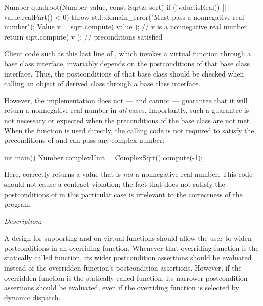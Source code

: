 \begin{codeblock}
Number quadroot(Number value, const Sqrt& sqrt) {
  if (!value.isReal() || value.realPart() < 0) {
    throw std::domain_error("Must pass a nonnegative real number");
  }
  Value v = sqrt.compute( {value} ); // v is a nonnegative real number
  return sqrt.compute( {v} ); // preconditions satisfied 
}
\end{codeblock}

Client code such as this last line of , which invokes a virtual function through a base class interface, invariably depends on the postconditions of that base class interface. Thus, the postconditions of that base class should be checked when calling an object of derived class through a base class interface.

However, the implementation  does not --- and cannot --- guarantee that it will return a nonnegative real number in \emph{all} cases. Importantly, such a guarantee is not necessary or expected when the preconditions of the base class are not met. When the function  is used directly, the calling code is not required to satisfy the preconditions of  and can pass any complex number:

\begin{codeblock}
int main() {
  Number complexUnit = ComplexSqrt().compute(-1);
}
\end{codeblock}

Here,  correctly returns a value that is \emph{not} a nonnegative real number. This code should not cause a contract violation; the fact that  does not satisfy the postconditions of  in this particular case is irrelevant to the correctness of the program.


\emph{Description}:

A design for supporting  and  on virtual functions should allow the user to widen postconditions in an overriding function. Whenever that overriding function is the statically called function, its wider postcondition assertions should be evaluated instead of the overridden function's postcondition assertions. However, if the overridden function is the statically called function, its narrower postcondition assertions should be evaluated, even if the overriding function is selected by dynamic dispatch.

